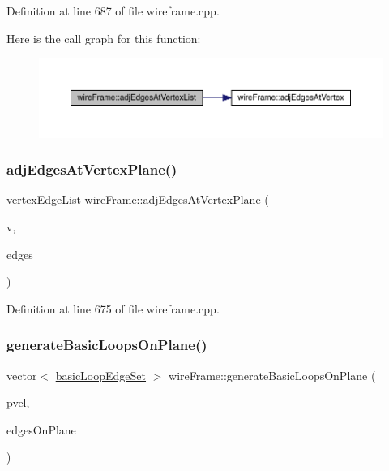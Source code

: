 Definition at line 687 of file wireframe.\+cpp.

Here is the call graph for this function\+:
\nopagebreak
\begin{figure}[H]
\begin{center}
\leavevmode
\includegraphics[width=350pt]{classwire_frame_a06a9b12235430a64bfb612ea2697bf4c_cgraph}
\end{center}
\end{figure}
\mbox{\label{classwire_frame_a717d472ad2f30ef43e26258794a944e7}} 
\subsubsection{\texorpdfstring{adj\+Edges\+At\+Vertex\+Plane()}{adjEdgesAtVertexPlane()}}
{\footnotesize\ttfamily \mbox{\hyperlink{structvertex_edge_list}{vertex\+Edge\+List}} wire\+Frame\+::adj\+Edges\+At\+Vertex\+Plane (\begin{DoxyParamCaption}\item[{\mbox{\hyperlink{structvertex3_d}{vertex3D}}}]{v,  }\item[{std\+::vector$<$ \mbox{\hyperlink{structedge3_d}{edge3D}} $>$}]{edges }\end{DoxyParamCaption})}



Definition at line 675 of file wireframe.\+cpp.

\mbox{\label{classwire_frame_ad570a0e37cc761e789d101904c64ef1a}} 
\subsubsection{\texorpdfstring{generate\+Basic\+Loops\+On\+Plane()}{generateBasicLoopsOnPlane()}}
{\footnotesize\ttfamily vector$<$ \mbox{\hyperlink{classbasic_loop_edge_set}{basic\+Loop\+Edge\+Set}} $>$ wire\+Frame\+::generate\+Basic\+Loops\+On\+Plane (\begin{DoxyParamCaption}\item[{\mbox{\hyperlink{structplane_v_e_l}{plane\+V\+EL}}}]{pvel,  }\item[{vector$<$ \mbox{\hyperlink{structedge3_d}{edge3D}} $>$}]{edges\+On\+Plane }\end{DoxyParamCaption})}



